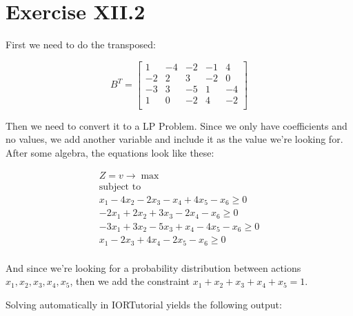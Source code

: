 \documentclass[titlepage, letterpaper]{article}
\begin{document}
\section{Exercise XII.2} %
\label{sec:exercise_xii_2}


First we need to do the transposed:

$$B^T = 
\begin{bmatrix}
1 & -4 & -2 & -1 & 4 \\
-2 & 2 & 3 & -2 & 0 \\
-3 & 3 & -5 & 1 & -4 \\
1 & 0 & -2 & 4 & -2 \\
\end{bmatrix}$$

Then we need to convert it to a LP Problem.
Since we only have coefficients and no values,
we add another variable and include it as the value we're looking for.
After some algebra, the equations look like these:

\begin{align}
    Z = v \to \max \\
    \text{subject to} \\
    x_1 -4x_2 -2x_3 -x_4 +4x_5 -x_6 \geq 0 \\
    -2x_1 +2x_2 + 3x_3 -2x_4 -x_6 \geq 0 \\
    -3x_1 + 3x_2 -5x_3 + x_4 -4x_5 -x_6 \geq 0 \\
    x_1 -2 x_3 +4 x_4 -2x_5 -x_6 \geq 0 \\
\end{align}

And since we're looking for a probability distribution between actions $x_1, x_2, x_3, x_4, x_5$, then we add the constraint $x_1 + x_2 + x_3 + x_4 + x_5= 1$.

Solving automatically in IORTutorial yields the following output:

\end{document}

